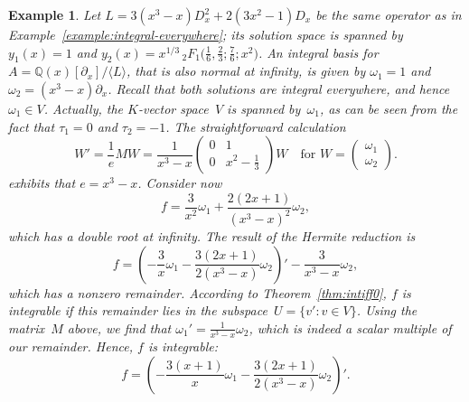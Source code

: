 \documentclass[final,1p,times,authoryear]{elsarticle}
\newtheorem{example}[theorem]{Example}
\def\<#1>{\langle#1\rangle}
\newcommand{\bQ}{ {\mathbb Q}}
\begin{document}
\begin{example}
Let $L = 3 (x^3-x) D_x^2 + 2 (3x^2 - 1) D_x$ be the same operator as in
Example~\ref{example:integral-everywhere}; its solution space is spanned by
$y_1(x)=1$ and $y_2(x)=x^{1/3}{}\,_2F_{\!1}\bigl(\frac16,\frac23;\frac76;x^2\bigr)$.
An integral basis for $A=\bQ(x)[\partial_x]/\<L>$, that is also normal at
infinity, is given by $\omega_1=1$ and $\omega_2=(x^3-x)\partial_x$. Recall
that both solutions are integral everywhere, and hence $\omega_1\in V$.
Actually, the $K$-vector space~$V$ is spanned by~$\omega_1$, as can be seen
from the fact that $\tau_1=0$ and $\tau_2=-1$. The straightforward calculation
\[
  W' = \frac{1}{e}MW =
  \frac{1}{x^3-x}\begin{pmatrix}0 & 1\\ 0 & x^2-\frac13\end{pmatrix}W
  \quad\text{for }W=\begin{pmatrix}\omega_1\\ \omega_2\end{pmatrix}.
\]
exhibits that $e=x^3-x$. Consider now
\[
  f = \frac{3}{x^2}\omega_1 + \frac{2(2x+1)}{(x^3-x)^2}\omega_2,
\]
which has a double root at infinity. The result of the Hermite reduction is
\[
  f = \left(-\frac{3}{x}\omega_1-\frac{3(2x+1)}{2(x^3-x)}\omega_2\right)'
    - \frac{3}{x^3-x}\omega_2,
\]
which has a nonzero remainder. According to Theorem~\ref{thm:intiff0}, $f$
is integrable if this remainder lies in the subspace~$U=\{v':v\in V\}$.
Using the matrix~$M$ above, we find that $\omega_1'=\frac{1}{x^3-x}\omega_2$,
which is indeed a scalar multiple of our remainder. Hence, $f$ is integrable:
\[
  f = \left(-\frac{3(x+1)}{x}\omega_1 - \frac{3(2x+1)}{2(x^3-x)}\omega_2\right)'.
\]
\end{example}
\end{document}
